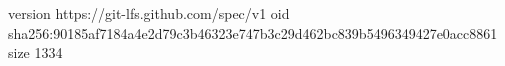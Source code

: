 version https://git-lfs.github.com/spec/v1
oid sha256:90185af7184a4e2d79c3b46323e747b3c29d462bc839b5496349427e0acc8861
size 1334
